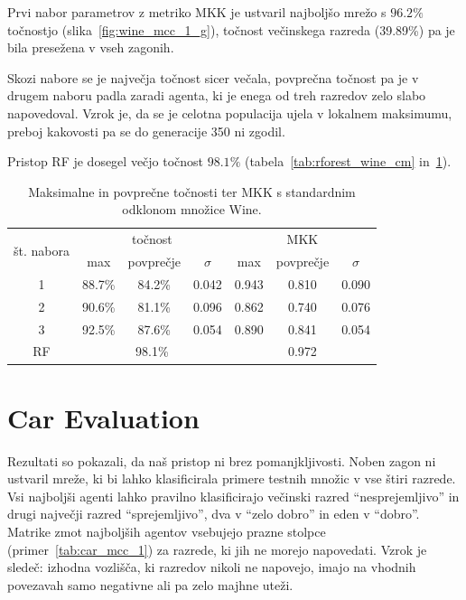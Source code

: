\documentclass[a4paper,12pt,openright]{book}
\begin{document}
    Prvi nabor parametrov z metriko MKK je ustvaril najboljšo mrežo s $96.2\%$ točnostjo (slika~\ref{fig:wine_mcc_1_g}),
    točnost večinskega razreda (39.89\%) pa je bila presežena v vseh zagonih.

    Skozi nabore se je največja točnost sicer večala, povprečna točnost pa je v drugem naboru padla zaradi agenta, ki je
    enega od treh razredov zelo slabo napovedoval.
    Vzrok je, da se je celotna populacija ujela v lokalnem maksimumu, preboj kakovosti pa se do generacije 350 ni zgodil.

    Pristop RF je dosegel večjo točnost $98.1\%$ (tabela~\ref{tab:rforest_wine_cm} in~\ref{tab:wine_result_aggregate}).

    \begin{table}[H]
        \begin{center}
            \begin{tabular}{|| c | c c c || c c c ||}
                \hline
                \multirow{2}{*}{št. nabora} & \multicolumn{3}{c||}{točnost} & \multicolumn{3}{c||}{MKK} \\ \cline{2-7}
                & max    & povprečje & $\sigma$ & max   & povprečje & $\sigma$ \\
                \hline
                1 & 88.7\% & 84.2\%    & 0.042    & 0.943 & 0.810     & 0.090    \\
                2 & 90.6\% & 81.1\%    & 0.096    & 0.862 & 0.740     & 0.076    \\
                3 & 92.5\% & 87.6\%    & 0.054    & 0.890 & 0.841     & 0.054    \\ \hline
                RF & \multicolumn{3}{c||}{98.1\%} & \multicolumn{3}{c||}{0.972} \\
                \hline
            \end{tabular}
        \end{center}
        \caption{Maksimalne in povprečne točnosti ter MKK s standardnim odklonom množice Wine.}
        \label{tab:wine_result_aggregate}
    \end{table}


    \section{Car Evaluation}\label{sec:rezultati-car-evaluation}
    Rezultati so pokazali, da naš pristop ni brez pomanjkljivosti.
    Noben zagon ni ustvaril mreže, ki bi lahko klasificirala primere testnih množic v vse štiri razrede.
    Vsi najboljši agenti lahko pravilno klasificirajo večinski razred \enquote{nesprejemljivo} in drugi največji
    razred \enquote{sprejemljivo}, dva v \enquote{zelo dobro} in eden v \enquote{dobro}.
    Matrike zmot najboljših agentov vsebujejo prazne stolpce (primer~\ref{tab:car_mcc_1}) za razrede, ki jih ne morejo napovedati.
    Vzrok je sledeč: izhodna vozlišča, ki razredov nikoli ne napovejo, imajo na vhodnih povezavah samo negativne ali pa zelo majhne uteži.
\end{document}
